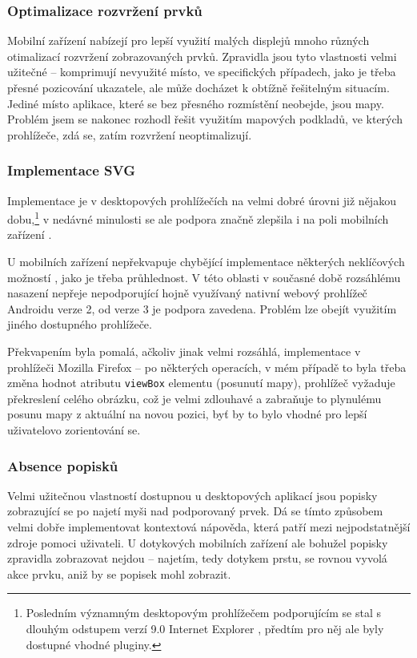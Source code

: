 \subsubsection{Optimalizace rozvržení prvků}
Mobilní zařízení nabízejí pro lepší využití malých displejů mnoho různých otimalizací rozvržení zobrazovaných prvků. Zpravidla jsou tyto vlastnosti velmi užitečné -- komprimují nevyužité místo, ve specifických případech, jako je třeba přesné pozicování ukazatele, ale může docházet k obtížně řešitelným situacím. Jediné místo aplikace, které se bez přesného rozmístění neobejde, jsou mapy. Problém jsem se nakonec rozhodl řešit využitím   mapových podkladů, ve kterých prohlížeče, zdá se, zatím rozvržení neoptimalizují.

\subsubsection{Implementace SVG}
Implementace  je v desktopových prohlížečích na velmi dobré úrovni již nějakou dobu,\footnote{Posledním významným desktopovým prohlížečem podporujícím  se stal s dlouhým odstupem verzí 9.0 Internet Explorer \cite{CanIUse}, předtím pro něj ale byly dostupné vhodné pluginy.} v nedávné minulosti se ale podpora značně zlepšila i na poli mobilních zařízení \cite{CanIUse}.

U mobilních zařízení nepřekvapuje chybějící implementace některých neklíčových možností , jako je třeba průhlednost. V této oblasti v současné době rozsáhlému nasazení nepřeje  nepodporující hojně využívaný nativní webový prohlížeč Androidu verze 2, od verze 3 je podpora zavedena. Problém lze obejít využitím jiného dostupného prohlížeče.

Překvapením byla pomalá, ačkoliv jinak velmi rozsáhlá, implementace  v prohlížeči Mozilla Firefox -- po některých operacích, v mém případě to byla třeba změna hodnot atributu \texttt{viewBox}  elementu (posunutí mapy), prohlížeč vyžaduje překreslení celého obrázku, což je velmi zdlouhavé a zabraňuje to plynulému posunu mapy z aktuální na novou pozici, byť by to bylo vhodné pro lepší uživatelovo zorientování se.

\subsubsection{Absence popisků}
Velmi užitečnou vlastností dostupnou u desktopových aplikací jsou popisky zobrazující se po najetí myši nad podporovaný prvek. Dá se tímto způsobem velmi dobře implementovat kontextová nápověda, která patří mezi nejpodstatnější zdroje pomoci uživateli. U dotykových mobilních zařízení ale bohužel popisky zpravidla zobrazovat nejdou -- najetím, tedy dotykem prstu, se rovnou vyvolá akce prvku, aniž by se popisek mohl zobrazit.

